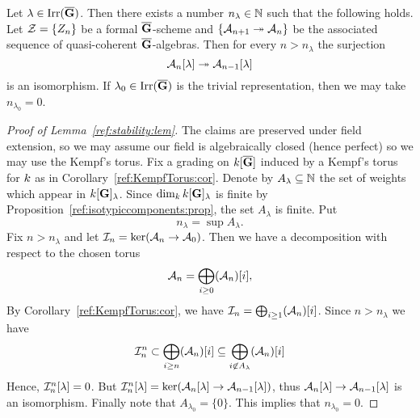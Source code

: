 \begin{lemma}\label{ref:stability:lem}
Let $\lambda\in \operatorname{Irr}(\overline{\mathbf{G}})$. Then there exists a number $n_{\lambda}\in {\mathbb N}$
such that the following holds. Let ${\mathcal Z}=\{Z_n\}$ be a formal $\overline{\mathbf{G}}$-scheme
and $\{{\mathcal A}_{n+1} \twoheadrightarrow {\mathcal A}_n\}$ be the associated sequence of quasi-coherent
$\overline{\mathbf{G}}$-algebras. Then for every $n > n_{\lambda}$ the surjection
\[
    {\mathcal A}_{n}[\lambda] \twoheadrightarrow {\mathcal A}_{n-1}[\lambda]
\]
is an isomorphism. If $\lambda_0\in \operatorname{Irr}(\overline{\mathbf{G}})$ is the
trivial representation, then we may take $n_{\lambda_0}=0$.
\end{lemma}
\begin{proof}[Proof of Lemma~\ref{ref:stability:lem}]
    The claims are preserved under field extension, so we may assume our field
    is algebraically closed (hence perfect) so we may use the Kempf's torus.
    Fix a grading on
    $k[\overline{\mathbf{G}}]$ induced by a Kempf's torus for $k$ as in
    Corollary~\ref{ref:KempfTorus:cor}. Denote by $A_{\lambda}\subseteq {\mathbb N}$
    the set of weights which appear in
    $k[\mathbf{G}]_{\lambda}$. Since $\dim_{k}k[\mathbf{G}]_{\lambda}$
    is finite by Proposition~\ref{ref:isotypiccomponents:prop}, the set
    $A_{\lambda}$ is finite. Put
    \[
        n_{\lambda}=\sup A_{\lambda}.
    \]
    Fix $n> n_{\lambda}$ and let
    ${\mathcal I}_n = \ker({\mathcal A}_n\to {\mathcal A}_0)$. Then we have a decomposition
    with respect to the chosen torus
    \[
        {\mathcal A}_n=\bigoplus_{i\geq 0}({\mathcal A}_n)[i],
    \]
    By Corollary~\ref{ref:KempfTorus:cor}, we have ${\mathcal I}_n =
    \bigoplus_{i\geq 1}({\mathcal A}_n)[i]$. Since $n > n_{\lambda}$ we have
    \[
        {\mathcal I}^{n}_n \subset \bigoplus_{i\geq
        n}({\mathcal A}_n)[i]\subseteq \bigoplus_{i \not \in
            A_{\lambda}}({\mathcal A}_n)[i]
    \]
Hence, ${\mathcal I}^{n}_n[\lambda] = 0$. But
${\mathcal I}^{n}_n[\lambda] = \ker({\mathcal A}_{n}[\lambda] \to
{\mathcal A}_{n-1}[\lambda])$, thus ${\mathcal A}_{n}[\lambda] \to {\mathcal A}_{n-1}[\lambda]$ is an
isomorphism.
Finally note that $A_{\lambda_0}=\{0\}$. This implies that $n_{\lambda_0}=0$.
\end{proof}

